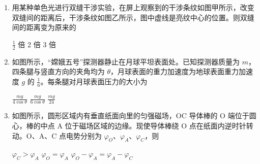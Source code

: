 \documentclass[\gkver]{gaokaozhenti}
\begin{document}
\begin{enumerate}
{故选 A。
}

\item
用某种单色光进行双缝干涉实验，在屏上观察到的干涉条纹如图甲所示，改变双缝间的距离后，干涉条纹如图乙所示，图中虚线是亮纹中心的位置。则双缝间的距离变为原来的


{$\frac{1}{2}$ 倍}
{2 倍}
{3 倍}


\item
如图所示，“嫦娥五号”探测器静止在月球平坦表面处。已知探测器质量为 $m$，四条腿与竖直方向的夹角均为 $\theta$，月球表面的重力加速度为地球表面重力加速度 $g$ 的 $\frac{1}{6}$。每条腿对月球表面压力的大小为


{$\frac{mg}{4\cos\theta}$}
{$\frac{mg}{6\cos\theta}$}
{$\frac{mg}{24}$}


\item
如图所示，圆形区域内有垂直纸面向里的匀强磁场，OC 导体棒的 O 端位于圆心，棒的中点 A 位于磁场区域的边缘。现使导体棒绕 O 点在纸面内逆时针转动。O、A、C 点电势分别为 $\varphi_{O}$、$\varphi_{A}$、$\varphi_{C}$，则


{$\varphi_{C}>\varphi_{A}$}
{$\varphi_{O}=\varphi_{A}$}
{$\varphi_{O}-\varphi_{A}=\varphi_{A}-\varphi_{C}$}


\end{enumerate}
\end{document}
